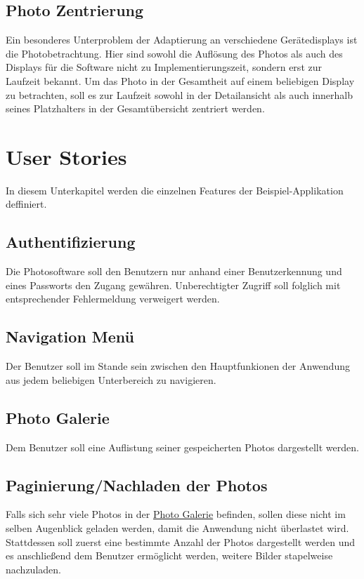 \subsection{Photo Zentrierung}

Ein besonderes Unterproblem der Adaptierung an verschiedene Gerätedisplays ist die Photobetrachtung. Hier sind sowohl die Auflösung des Photos als auch des Displays für die Software nicht zu Implementierungszeit, sondern erst zur Laufzeit bekannt. Um das Photo in der Gesamtheit auf einem beliebigen Display zu betrachten, soll es zur Laufzeit sowohl in der Detailansicht als auch innerhalb seines Platzhalters in der Gesamtübersicht zentriert werden.

\section{User Stories}

In diesem Unterkapitel werden die einzelnen Features der Beispiel-Applikation deffiniert.

\subsection{Authentifizierung}
\label{sec:authentication}

Die Photosoftware soll den Benutzern nur anhand einer Benutzerkennung und eines Passworts den Zugang gewähren. Unberechtigter Zugriff soll folglich mit entsprechender Fehlermeldung verweigert werden.

\subsection{Navigation Menü}

Der Benutzer soll im Stande sein zwischen den Hauptfunkionen der Anwendung aus jedem beliebigen Unterbereich zu navigieren.

\subsection{Photo Galerie}
\label{sec:photo_galerie}

Dem Benutzer soll eine Auflistung seiner gespeicherten Photos dargestellt werden.

\subsection{Paginierung/Nachladen der Photos}

Falls sich sehr viele Photos in der \hyperref[ssec:photo_galerie]{Photo Galerie} befinden, sollen diese nicht im selben Augenblick geladen werden, damit die Anwendung nicht überlastet wird. Stattdessen soll zuerst eine bestimmte Anzahl der Photos dargestellt werden und es anschließend dem Benutzer ermöglicht werden, weitere Bilder stapelweise nachzuladen.

